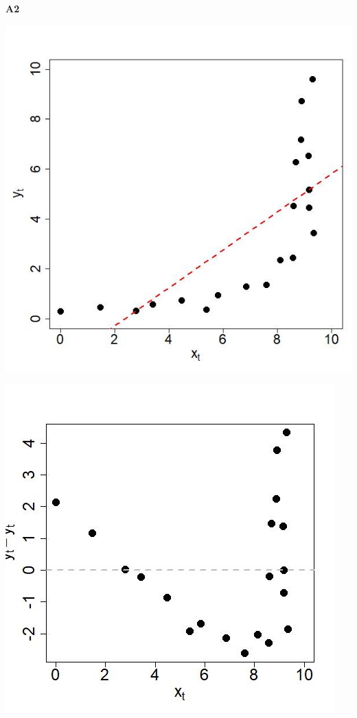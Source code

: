 \documentclass[captions=tableheading, 12pt, headings=small, parskip=half]{scrartcl}
\begin{document}
\begin{enumerate}[label = \alph*)]
{		\begin{minipage}{0.05\columnwidth}
		\begin{center}
			\Large \textbf{A2}
		\end{center}
		\end{minipage}
		\hfill
		\begin{minipage}{0.46\columnwidth}
			\includegraphics[width= \columnwidth]{Code1/A2.jpeg}
		\end{minipage}
		\hfill
		\begin{minipage}{0.46\columnwidth}
			\includegraphics[width= \columnwidth]{Code1/A2_res.jpeg}
		\end{minipage}
	
}
\end{enumerate}
\end{document}
